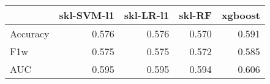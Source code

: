 \begin{tabular}{lrrrr}
\toprule
{} &  skl-SVM-l1 &  skl-LR-l1 &  skl-RF &  xgboost \\
\midrule
Accuracy &       0.576 &      0.576 &   0.570 &    0.591 \\
F1w      &       0.575 &      0.575 &   0.572 &    0.585 \\
AUC      &       0.595 &      0.595 &   0.594 &    0.606 \\
\bottomrule
\end{tabular}
